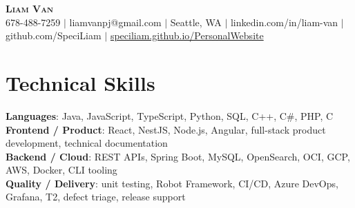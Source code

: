 \documentclass[letterpaper,11pt]{article}
\begin{document}

%
\begin{center}
    \textbf{\Huge \scshape Liam Van} \\ \vspace{1pt}
    \small 678-488-7259 $|$ \small {liamvanpj@gmail.com} $|$ Seattle, WA
 {{$|$ linkedin.com/in/liam-van} {$|$ github.com/SpeciLiam} {$|$ \href{https://speciliam.github.io/PersonalWebsite}{speciliam.github.io/PersonalWebsite}}}

\end{center}

\section{Technical Skills}
 \begin{itemize}[leftmargin=0.15in, label={}]
    \small{\item{
     \textbf{Languages}{: Java, JavaScript, TypeScript, Python, SQL, C++, C\#, PHP, C} \\
     \textbf{Frontend / Product}{: React, NestJS, Node.js, Angular, full-stack product development, technical documentation} \\
     \textbf{Backend / Cloud}{: REST APIs, Spring Boot, MySQL, OpenSearch, OCI, GCP, AWS, Docker, CLI tooling} \\
     \textbf{Quality / Delivery}{: unit testing, Robot Framework, CI/CD, Azure DevOps, Grafana, T2, defect triage, release support} \\
    }}
 \end{itemize}
%
\end{document}

